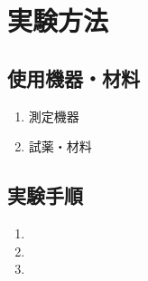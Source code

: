 
\section{実験方法}

\subsection{使用機器・材料}
  \begin{enumerate}
    \item 測定機器\\
      \quad %
    \item 試薬・材料\\
      \quad %
  \end{enumerate}

\subsection{実験手順}
  \begin{enumerate}
    \item %
    \item %
    \item %
  \end{enumerate}
